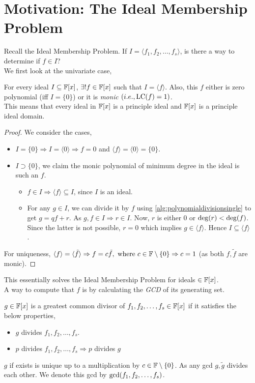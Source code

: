 \documentclass[a4paper,11pt]{article}
\begin{document}
\section{Motivation: The Ideal Membership Problem}
Recall the Ideal Membership Problem. If $I=\langle f_1,f_2,\ldots,f_s\rangle$, is there a way to determine if $f\in I$?\\
We first look at the univariate case,
\begin{prop}{\label{eq:univariatepid}}
    For every ideal $I\subseteq\mathbb{F}[x]$, $\exists! f \in\mathbb{F}[x]$ such that $I=\langle f\rangle$. Also, this $f$ either is zero polynomial (iff $I=\{0\}$) or it is \emph{monic} $(i.e., \operatorname{LC}(f)=1)$.\\This means that every ideal in $\mathbb{F}[x]$ is a principle ideal and $\mathbb{F}[x]$ is a principle ideal domain.
\end{prop}
\begin{proof}
We consider the cases,
    \begin{itemize}
        \item $I=\{0\}\Rightarrow I = \langle 0\rangle \Rightarrow f= 0$ and $\langle f\rangle=\langle 0\rangle=\{0\}$.
        \item $I\supset\{0\}$, we claim the monic polynomial of minimum degree in the ideal is such an $f$.
        \begin{itemize}
            \item $f\in I\Rightarrow \langle f\rangle\subseteq I$, since $I$ is an ideal. %
            \item For any $g\in I$, we can divide it by $f$ using \ref{alg:polynomialdivisionsingle} to get $g=qf+r$. As $g, f \in I\Rightarrow r \in I$. Now, $r$ is either 0 or $\operatorname{deg}(r)<\operatorname{deg}(f)$. Since the latter is not possible, $r=0$ which implies $g\in \langle f\rangle$. Hence $I\subseteq \langle f\rangle$.
        \end{itemize}
    \end{itemize}
    For uniqueness, $\langle f\rangle=\langle \tilde{f}\rangle \Rightarrow f = c\tilde{f}, \text{ where } c\in\mathbb{F}\setminus\{0\}\Rightarrow c = 1$ (as both $f,\tilde{f}$ are monic).
\end{proof}
This essentially solves the Ideal Membership Problem for ideals $\in\mathbb{F}[x]$.\\
A way to compute that $f$ is by calculating the \emph{GCD} of its generating set.
\begin{defn}
    $g\in\mathbb{F}[x]$ is a greatest common divisor of $f_1,f_2,\ldots,f_s \in \mathbb{F}[x]$ if it satisfies the below properties,
    \begin{itemize}
        \item $g$ divides $f_1,f_2,\ldots,f_s$.
        \item $p$ divides $f_1,f_2,\ldots,f_s\Rightarrow p$ divides $g$
    \end{itemize}
    $g$ if exists is unique up to a multiplication by $c\in\mathbb{F}\setminus\{0\}$. As any gcd $g,\tilde{g}$ divides each other. We denote this gcd by $\operatorname{gcd}(f_1,f_2,\ldots,f_s)$.
\end{defn}
\end{document}
